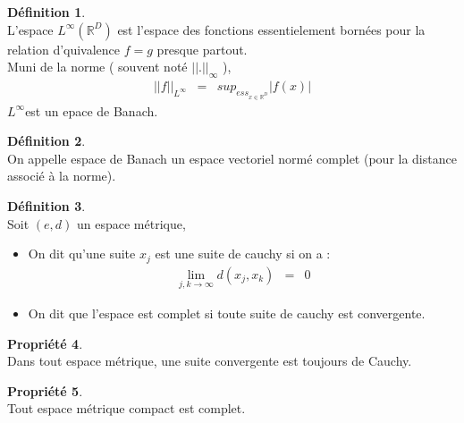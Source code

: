 \documentclass[a4paper,11pt]{article}
\theoremstyle{plain}
\theoremstyle{definition}
\newtheorem{dfn}{Définition}[section]
\newtheorem{prop}[dfn]{Propriété}
\theoremstyle{remark}
\numberwithin{equation}{section}
\numberwithin{equation}{subsection}
\numberwithin{figure}{section}
\begin{document}
\begin{dfn} $\left. \right. $\\
 L'espace $L^{\infty}(\mathbb{R}^{D})$ est l'espace des fonctions essentielement bornées pour la relation d'quivalence $f=g$ presque partout.\\
Muni de la norme ( souvent noté $\left|\left| .  \right| \right|_{\infty}$ ),
\begin{eqnarray}
 \left|\left| f  \right| \right|_{L^{\infty}}  &=& sup_{ess_{x \in \mathbb{R}^{D} }}  \left| f(x) \right|
\end{eqnarray}
$L^{\infty}$est un epace de Banach.
\end{dfn}
\begin{dfn} $\left. \right. $\\
 On appelle espace de Banach un espace vectoriel normé complet (pour la distance associé à la norme).
\end{dfn}
\begin{dfn} $\left. \right. $\\
 Soit $(e,d)$ un espace métrique,
\begin{itemize}
 \item On dit qu'une suite $x_{j}$ est une suite de cauchy si on a :
\begin{eqnarray}
 \lim_{j,k  \to \infty}  d(x_{j}, x_{k}) &=& 0
\end{eqnarray}
\item On dit que l'espace est complet si toute suite de cauchy est convergente.
\end{itemize}
\end{dfn}
\begin{prop} $\left. \right. $\\
 Dans tout espace métrique, une suite convergente est toujours de Cauchy.
\end{prop}
\begin{prop} $\left. \right. $\\
 Tout espace métrique compact est complet.
\end{prop}
\end{document}
